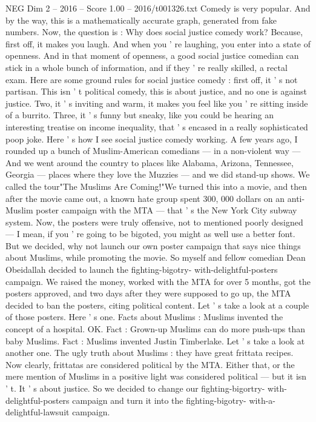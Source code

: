 \begin{textsample}{NEG Dim 2 – 2016 – Score 1.00 – 2016/t001326.txt}
Comedy is very popular.
And by the way, this is a mathematically accurate graph, generated from fake numbers.
Now, the question is : Why does social justice comedy work?
Because, first off, it makes you laugh.
And when you ' re laughing, you enter into a state of openness.
And in that moment of openness, a good social justice comedian can stick in a whole bunch of information, and if they ' re really skilled, a rectal exam.
Here are some ground rules for social justice comedy : first off, it ' s not partisan.
This isn ' t political comedy, this is about justice, and no one is against justice.
Two, it ' s inviting and warm, it makes you feel like you ' re sitting inside of a burrito.
Three, it ' s funny but sneaky, like you could be hearing an interesting treatise on income inequality, that ' s encased in a really sophisticated poop joke.
Here ' s how I see social justice comedy working.
A few years ago, I rounded up a bunch of Muslim-American comedians — in a non-violent way — And we went around the country to places like Alabama, Arizona, Tennessee, Georgia — places where they love the Muzzies — and we did stand-up shows.
We called the tour"The Muslims Are Coming!"We turned this into a movie, and then after the movie came out, a known hate group spent 300, 000 dollars on an anti-Muslim poster campaign with the MTA — that ' s the New York City subway system.
Now, the posters were truly offensive, not to mentioned poorly designed — I mean, if you ' re going to be bigoted, you might as well use a better font.
But we decided, why not launch our own poster campaign that says nice things about Muslims, while promoting the movie.
So myself and fellow comedian Dean Obeidallah decided to launch the fighting-bigotry- with-delightful-posters campaign.
We raised the money, worked with the MTA for over 5 months, got the posters approved, and two days after they were supposed to go up, the MTA decided to ban the posters, citing political content.
Let ' s take a look at a couple of those posters.
Here ' s one.
Facts about Muslims : Muslims invented the concept of a hospital.
OK.
Fact : Grown-up Muslims can do more push-ups than baby Muslims.
Fact : Muslims invented Justin Timberlake.
Let ' s take a look at another one.
The ugly truth about Muslims : they have great frittata recipes.
Now clearly, frittatas are considered political by the MTA.
Either that, or the mere mention of Muslims in a positive light was considered political — but it isn ' t.
It ' s about justice.
So we decided to change our fighting-bigortry- with- delightful-posters campaign and turn it into the fighting-bigotry- with-a- delightful-lawsuit campaign.

\end{textsample}
